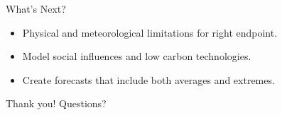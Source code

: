 \documentclass[notes]{beamer}
\begin{document}
\begin{frame}{What's Next?}
\begin{itemize}
\item Physical and meteorological limitations for right endpoint.
\item Model social influences and low carbon technologies.
\item Create forecasts that include both averages and extremes.
\end{itemize}
\end{frame}


\begin{frame}{Thank you!}
\centering Questions?
\end{frame}


\end{document}

